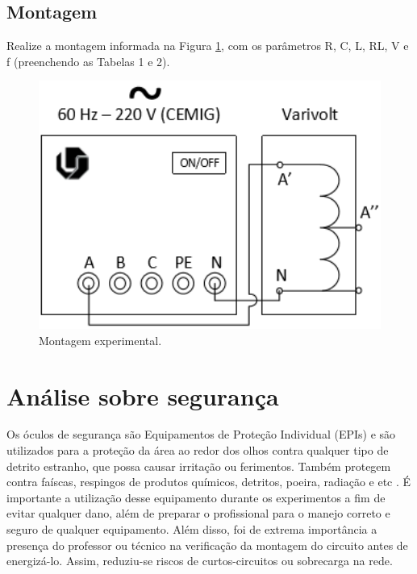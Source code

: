 \documentclass[a4paper,12pt,oneside,openany,table,xcdraw]{article}
\begin{document}
\subsection{Montagem} %

Realize a montagem informada na Figura \ref{fig1}, com os parâmetros R, C, L, RL, V e f (preenchendo as
Tabelas 1 e 2). 

\begin{figure}[H]
\centering
\captionsetup{font=scriptsize}
\includegraphics[width=14.5cm]{fig1}
\caption{Montagem experimental.}
\label{fig1}
\end{figure}


\section{Análise sobre segurança} %
Os óculos de segurança são Equipamentos de Proteção Individual (EPIs) e são utilizados para a proteção da área ao redor dos olhos contra qualquer tipo de detrito estranho, que possa causar irritação ou ferimentos. Também protegem contra faíscas, respingos de produtos químicos, detritos, poeira, radiação e etc \cite{safe}.
É importante a utilização desse equipamento durante os experimentos a fim de evitar qualquer dano, além de preparar o profissional para o manejo correto e seguro de qualquer equipamento.
Além disso, foi de extrema importância a presença do professor ou técnico na verificação da montagem do circuito antes de energizá-lo. Assim, reduziu-se riscos de curtos-circuitos ou sobrecarga na rede.
\end{document}
